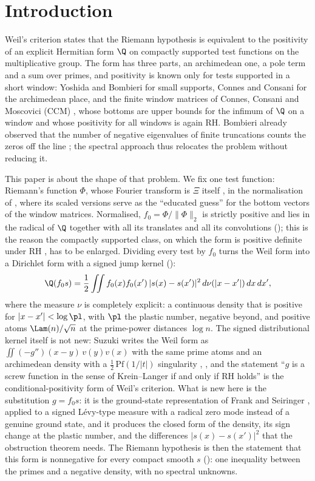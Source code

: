 \section{Introduction}\label{sec:intro}

Weil's criterion \cite{Weil1952} states that the Riemann hypothesis is equivalent to the positivity of an explicit
Hermitian form $\Q$ on compactly supported test functions on the multiplicative group. The form has three parts, an
archimedean one, a pole term and a sum over primes, and positivity is known only for tests supported in a short window:
Yoshida \cite{YOSHIDA-HERMITIAN-1992} and Bombieri \cite{BOMBIERI-WEILQF-2000} for small supports, Connes and Consani
\cite{CC-WEILPOS-2020} for the archimedean place, and the finite window matrices of Connes, Consani and Moscovici (CCM)
\cite{CCM-ZST-2025}, whose bottoms are upper bounds for the infimum of $\Q$ on a window and whose positivity for all windows
is again RH. Bombieri already observed that the number of negative eigenvalues of finite truncations counts the zeros off the
line \cite{BOMBIERI-WEILQF-2000}; the spectral approach thus relocates the problem without reducing it.

This paper is about the shape of that problem. We fix one test function: Riemann's function $\Phi$, whose Fourier transform is
$\Xi$ itself \cite{Riemann1859}, in the normalisation of \cite[Lemma 7.1]{CCM-ZST-2025}, where its scaled versions serve as
the ``educated guess'' for the bottom vectors of the window matrices. Normalised, $f_0=\Phi/\|\Phi\|_2$ is strictly positive and
lies in the radical of $\Q$ together with all its translates and all its convolutions (); this is the reason
the compactly supported class, on which the form is positive definite under RH \cite{Suzuki2025}, has to be enlarged.
Dividing every test by $f_0$ turns the Weil form into a Dirichlet form with a signed jump kernel ():
\[
 \Q(f_0s)=\frac12\iint f_0(x)f_0(x')\,|s(x)-s(x')|^2\,d\nu(|x-x'|)\,dx\,dx',
\]
where the measure $\nu$ is completely explicit: a continuous density that is positive for $|x-x'|<\log\pl$, with $\pl$ the plastic
number, negative beyond, and positive atoms $\Lam(n)/\sqrt n$ at the prime-power distances $\log n$. The signed distributional kernel itself is
not new: Suzuki writes the Weil form as $\iint(-g'')(x-y)\,v(y)v(x)$ with the same prime atoms and an archimedean density with a
$\tfrac12\,\mathrm{Pf}(1/|t|)$ singularity \cite[\S2.5]{Suzuki2026}, \cite[\S3.5]{Suzuki2025}, and the statement ``$g$ is a screw
function in the sense of Krein--Langer if and only if RH holds'' \cite{Suzuki2026} is the conditional-positivity form of Weil's
criterion. What is new here is the substitution $g=f_0s$: it is the ground-state representation of Frank and Seiringer
\cite{FrankSeiringer2008}, applied to a signed L\'evy-type measure with a radical zero mode instead of a genuine ground state, and
it produces the closed form of the density, its sign change at the plastic number, and the differences $|s(x)-s(x')|^2$ that the
obstruction theorem needs. The Riemann hypothesis is then the statement that this form is nonnegative for every compact smooth $s$
(): one inequality between the primes and a negative density, with no spectral unknowns.

